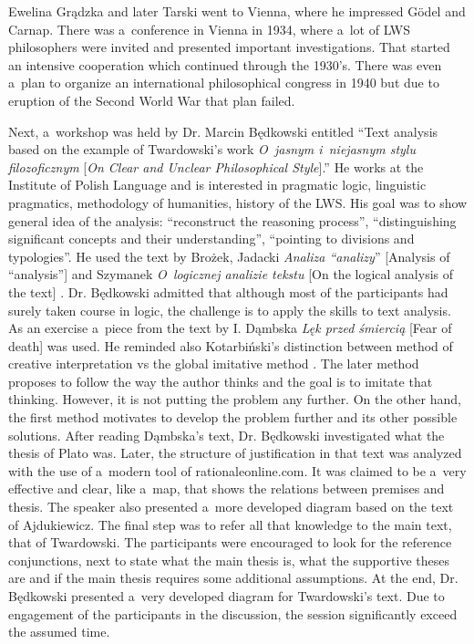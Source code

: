 \begin{editorialeng}{Ewelina Grądzka}
and later Tarski went to Vienna, where he impressed Gödel and Carnap. There was a~conference in Vienna in 1934, where a~lot of LWS philosophers were invited and presented important investigations. That started an intensive cooperation which continued through the 1930’s. There was even a~plan to organize an international philosophical congress in 1940 but due to eruption of the Second World War that plan failed.

Next, a~workshop was held by Dr. Marcin Będkowski entitled ``Text analysis based on the example of Twardowski’s work \textit{O~jasnym i~niejasnym stylu filozoficznym} [\textit{On Clear and Unclear Philosophical Style}].''
\parencites[cf.][]{twardowski_o_1927}[eng. transl.][]{brandl_clear_1999} %
 He works at the Institute of Polish Language and is interested in pragmatic logic, linguistic pragmatics, methodology of humanities, history of the LWS. His goal was to show general idea of the analysis: ``reconstruct the reasoning process'', ``distinguishing significant concepts and their understanding'', ``pointing to divisions and typologies''. He used the text by Brożek, Jadacki \textit{Analiza ``analizy}'' [Analysis of ``analysis''] 
\parencite*[][]{brozek_analiza_2006} %
 and Szymanek \textit{O~logicznej analizie tekstu} [On the logical analysis of the text] 
\parencite*[][]{szymanek_o_2010}. %
 Dr. Będkowski admitted that although most of the participants had surely taken course in logic, the challenge is to apply the skills to text analysis. As an exercise a~piece from the text by I. Dąmbska \textit{Lęk przed śmiercią} [Fear of death] was used. He reminded also Kotarbiński’s distinction between method of creative interpretation vs the global imitative method 
\parencite[cf.][]{kotarbinski_praxiology_1965}. %
 The later method proposes to follow the way the author thinks and the goal is to imitate that thinking. However, it is not putting the problem any further. On the other hand, the first method motivates to develop the problem further and its other possible solutions. After reading Dąmbska’s text, Dr. Będkowski investigated what the thesis of Plato was. Later, the structure of justification in that text was analyzed with the use of a~modern tool of rationaleonline.com. It was claimed to be a~very effective and clear, like a~map, that shows the relations between premises and thesis. The speaker also presented a~more developed diagram based on the text of Ajdukiewicz. The final step was to refer all that knowledge to the main text, that of Twardowski. The participants were encouraged to look for the reference conjunctions, next to state what the main thesis is, what the supportive theses are and if the main thesis requires some additional assumptions. At the end, Dr. Będkowski presented a~very developed diagram for Twardowski’s text. Due to engagement of the participants in the discussion, the session significantly exceed the assumed time.


\end{editorialeng}
